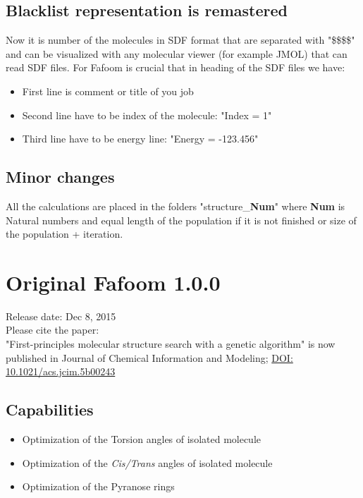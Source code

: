 \documentclass[a4paper]{article}
\begin{document}
\subsection{Blacklist representation is remastered}
Now it is number of the molecules in SDF format that are separated with "\$\$\$\$" and can be visualized with any molecular viewer (for example JMOL) that can read SDF files. For Fafoom is crucial that in heading of the SDF files we have:
\begin{itemize}
	\item First line is comment or title of you job
    \item Second line have to be index of the molecule: "Index = 1"
    \item Third line have to be energy line: "Energy = -123.456"
\end{itemize}
\subsection{Minor changes}
All the calculations are placed in the folders "structure\_\textbf{Num}" where \textbf{Num} is Natural numbers and equal length of the population if it is not finished or size of the population + iteration. 
\newpage
\section{Original Fafoom 1.0.0}
Release date: Dec 8, 2015\\
Please cite the paper:\\
\newline 
"First-principles molecular structure search with a genetic algorithm" is now published in Journal of Chemical Information and Modeling; \href{https://doi.org/10.1021/acs.jcim.5b00243}{DOI: 10.1021/acs.jcim.5b00243}
\newline

\subsection{Capabilities}
\begin{itemize}
	\item Optimization of the Torsion angles of isolated molecule
    \item Optimization of the \textit{Cis/Trans} angles of isolated molecule
    \item Optimization of the Pyranose rings
\end{itemize}

%
%
\end{document}
